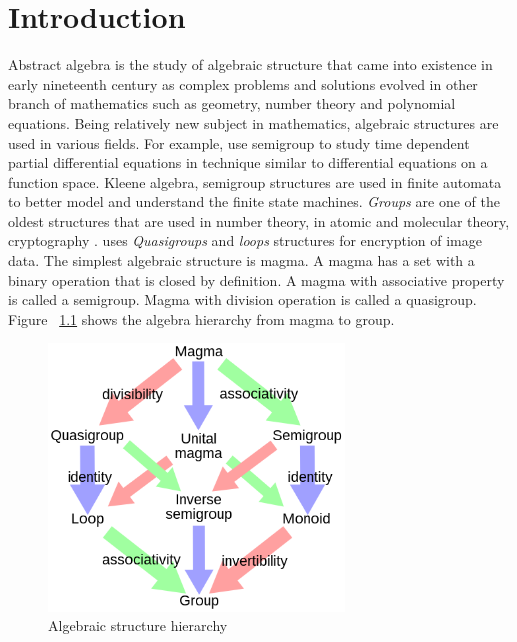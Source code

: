 \chapter{Introduction}
Abstract algebra is the study of algebraic structure that came into existence in
early nineteenth century as complex problems and solutions evolved in other
branch of mathematics such as geometry, number theory and polynomial equations.
Being relatively new subject in mathematics, algebraic structures are used in
various fields. For example, \cite{liaqat2021some} use semigroup  to study time dependent partial differential
equations in technique similar to differential equations on a function space.
Kleene algebra, semigroup structures are used in finite automata to better model
and understand the finite state machines. \textit{Groups} are one of the oldest
structures that are used in number theory, in atomic and molecular theory,
cryptography \cite{enwiki:1133598242}. \cite{bruck1944some} uses
\textit{Quasigroups} and \textit{loops} structures for encryption of image data.
The simplest algebraic structure is magma. A magma has a set with a binary
operation that is closed by definition. A magma with associative property is
called a semigroup. Magma with division operation is called a quasigroup. Figure
~\ref{fig_magma} shows the algebra hierarchy from magma to group. 
 \begin{figure}[ht]
	\centering
	\includegraphics[width=0.7\textwidth]{figures/Sample/Magma_to_group.jpg}
	\caption{Algebraic structure hierarchy \cite{enwiki:1107380309}}
	\label{fig_magma}
 \end{figure}

